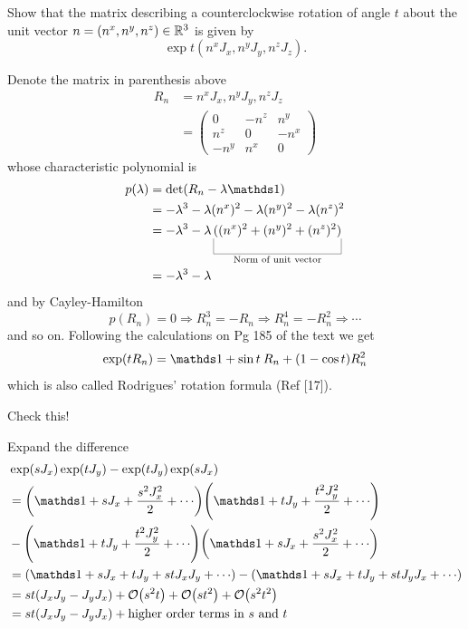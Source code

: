 \documentclass[10pt]{article}
\begin{document}
\begin{example}
	Show that the matrix describing a counterclockwise rotation of angle $t$ about the unit vector $n = (n^x, n^y, n^z) \in \mathbb{R}^3$ is given by
	$$
	\exp t(n^xJ_x, n^yJ_y, n^zJ_z).
	$$
\end{example}
\sol Denote the matrix in parenthesis above
$$
\begin{aligned}
	R_n &= n^xJ_x, n^yJ_y, n^zJ_z\\
	&= \begin{pmatrix}
		0&-n^z&n^y\\n^z&0&-n^x\\-n^y&n^x&0
	\end{pmatrix}
\end{aligned}
$$
whose characteristic polynomial is
$$
\begin{aligned}
	p(\lambda) &= \det(R_n-\lambda\id)\\
	&= -\lambda^3 -\lambda  (n^x)^2-\lambda  (n^y)^2-\lambda  (n^z)^2\\
	&= -\lambda^3 -\lambda  \ub{((n^x)^2+(n^y)^2+(n^z)^2)}{\text{Norm of unit vector}}\\
	&= -\lambda^3 -\lambda
\end{aligned}
$$
and by Cayley-Hamilton 
$$
p(R_n) = 0 \Rightarrow R_n^3 = -R_n \Rightarrow R_n^4 = -R_n^2 \Rightarrow \cdots
$$
and so on. Following the calculations on Pg 185 of the text we get
$$
\exp(tR_n) = \id + \sin t\:R_n + (1-\cos t)R_n^2
$$
which is also called Rodrigues' rotation formula (Ref [17]).


\begin{example}
	Check this!
\end{example}
\sol Expand the difference
$$
\begin{aligned}
	&\exp(sJ_x)\exp(tJ_y)-\exp(tJ_y)\exp(sJ_x)\\
	&= \p*{\id+sJ_x+\frac{s^2J_x^2}{2}+\cdots}\p*{\id+tJ_y+\frac{t^2J_y^2}{2}+\cdots}\\
	&-\p*{\id+tJ_y+\frac{t^2J_y^2}{2}+\cdots}\p*{\id+sJ_x+\frac{s^2J_x^2}{2}+\cdots}\\
	&= \p*{\id+sJ_x+tJ_y+stJ_xJ_y+\cdots}-\p*{\id+sJ_x+tJ_y+stJ_yJ_x+\cdots}\\
	&= st(J_xJ_y-J_yJ_x) + \BigO{s^2t} + \BigO{st^2} + \BigO{s^2t^2}\\
	&= st(J_xJ_y-J_yJ_x) + \text{higher order terms in $s$ and $t$}
\end{aligned}
$$
\end{document}
